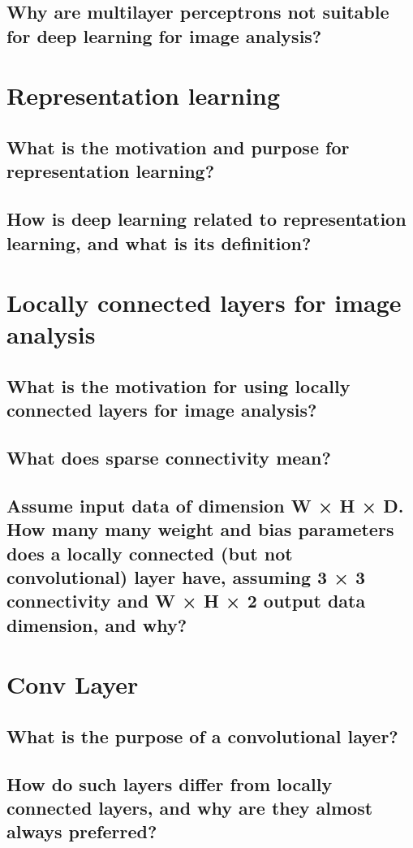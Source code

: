 \subsection{Why are multilayer perceptrons not suitable for deep learning for image analysis?}

\section{Representation learning}
\subsection{What is the motivation and purpose for representation learning?}
\subsection{How is deep learning related to representation learning, and what is its definition?}

\section{Locally connected layers for image analysis}
\subsection{What is the motivation for using locally connected layers for image analysis?}
\subsection{What does sparse connectivity mean?}
\subsection{Assume input data of dimension W × H × D. How many many weight and bias parameters does a locally connected (but not convolutional) layer have, assuming 3 × 3 connectivity and W × H × 2 output data dimension, and why?}

\section{Conv Layer}
\subsection{What is the purpose of a convolutional layer?}
\subsection{How do such layers differ from locally connected layers, and why are they almost always preferred?}

